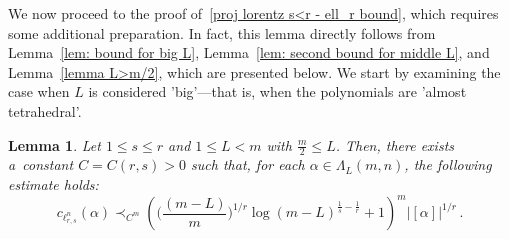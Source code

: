 \documentclass[12pt]{amsart}
\numberwithin{subsection}{section}
\newtheorem{lemma}[theorem]{Lemma}
\theoremstyle{definition}
\theoremstyle{remark}
\begin{document}
We now proceed to the proof of~\eqref{proj lorentz s<r - ell_r bound}, which requires some additional preparation.
In fact, this lemma directly follows from Lemma~\ref{lem: bound for big L}, Lemma~\ref{lem: second bound for middle L},
and Lemma~\ref{lemma L>m/2}, which are presented below. We start by examining the case when \( L \) is considered
'big'—that is, when the polynomials are 'almost tetrahedral'.


\begin{lemma}\label{rem: bound for coord fun}
Let  $1\le s \le r$ and $1 \le L < m$ with $\frac{m}{2} \leq L$. Then, there exists a~constant $C=C(r,s)>0$ such that,
for each $\alpha  \in \Lambda_{L}(m,n)$, the following estimate holds{\rm:}
\[
c_{\ell_{r,s}^n}(\alpha)
\prec_{C^m} \left( \Big(\frac{(m-L)}{m}\Big)^{1/r}\log(m-L)^{\frac1{s}-\frac1{r}}+1 \right)^m  |[\alpha]|^{1/r}\,.
\]
\end{lemma}
\end{document}
